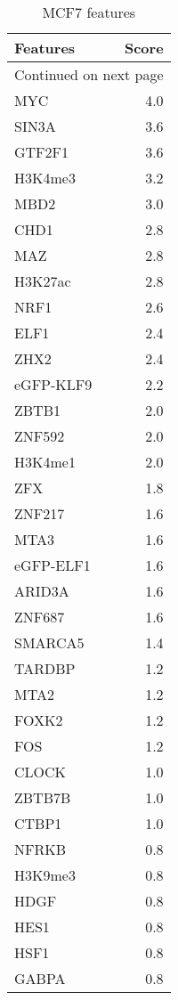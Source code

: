 \begin{longtable}{lr}
\caption{MCF7 features}\\
\toprule
   Features &  Score \\
\midrule
\endhead
\midrule
\multicolumn{2}{r}{{Continued on next page}} \\
\midrule
\endfoot

\bottomrule
\endlastfoot
        MYC &    4.0 \\
      SIN3A &    3.6 \\
     GTF2F1 &    3.6 \\
    H3K4me3 &    3.2 \\
       MBD2 &    3.0 \\
       CHD1 &    2.8 \\
        MAZ &    2.8 \\
    H3K27ac &    2.8 \\
       NRF1 &    2.6 \\
       ELF1 &    2.4 \\
       ZHX2 &    2.4 \\
  eGFP-KLF9 &    2.2 \\
      ZBTB1 &    2.0 \\
     ZNF592 &    2.0 \\
    H3K4me1 &    2.0 \\
        ZFX &    1.8 \\
     ZNF217 &    1.6 \\
       MTA3 &    1.6 \\
  eGFP-ELF1 &    1.6 \\
     ARID3A &    1.6 \\
     ZNF687 &    1.6 \\
    SMARCA5 &    1.4 \\
     TARDBP &    1.2 \\
       MTA2 &    1.2 \\
      FOXK2 &    1.2 \\
        FOS &    1.2 \\
      CLOCK &    1.0 \\
     ZBTB7B &    1.0 \\
      CTBP1 &    1.0 \\
      NFRKB &    0.8 \\
    H3K9me3 &    0.8 \\
       HDGF &    0.8 \\
       HES1 &    0.8 \\
       HSF1 &    0.8 \\
      GABPA &    0.8 \\

\end{longtable}
